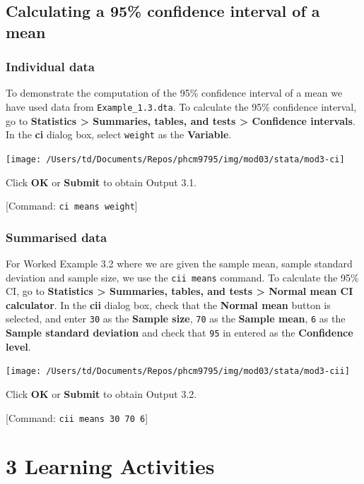 \documentclass[
]{memoir}
\begin{document}
\hypertarget{calculating-a-95-confidence-interval-of-a-mean}{%
\section{Calculating a 95\% confidence interval of a mean}\label{calculating-a-95-confidence-interval-of-a-mean}}

\hypertarget{individual-data}{%
\subsection{Individual data}\label{individual-data}}

To demonstrate the computation of the 95\% confidence interval of a mean we have used data from \texttt{Example\_1.3.dta}. To calculate the 95\% confidence interval, go to \textbf{Statistics \textgreater{} Summaries, tables, and tests \textgreater{} Confidence intervals}. In the \textbf{ci} dialog box, select \texttt{weight} as the \textbf{Variable}.

\texttt{[image: /Users/td/Documents/Repos/phcm9795/img/mod03/stata/mod3-ci]}

Click \textbf{OK} or \textbf{Submit} to obtain Output 3.1.

{[}Command: \texttt{ci\ means\ weight}{]}

\hypertarget{summarised-data}{%
\subsection{Summarised data}\label{summarised-data}}

For Worked Example 3.2 where we are given the sample mean, sample standard deviation and sample size, we use the \texttt{cii\ means} command. To calculate the 95\% CI, go to \textbf{Statistics \textgreater{} Summaries, tables, and tests \textgreater{} Normal mean CI calculator}. In the \textbf{cii} dialog box, check that the \textbf{Normal mean} button is selected, and enter \texttt{30} as the \textbf{Sample size}, \texttt{70} as the \textbf{Sample mean}, \texttt{6} as the \textbf{Sample standard deviation} and check that \texttt{95} in entered as the \textbf{Confidence level}.

\texttt{[image: /Users/td/Documents/Repos/phcm9795/img/mod03/stata/mod3-cii]}

Click \textbf{OK} or \textbf{Submit} to obtain Output 3.2.

{[}Command: \texttt{cii\ means\ 30\ 70\ 6}{]}

\hypertarget{learning-activities-2}{%
\chapter*{\texorpdfstring{\textbf{3} Learning Activities}{3 Learning Activities}}\label{learning-activities-2}}
\end{document}
